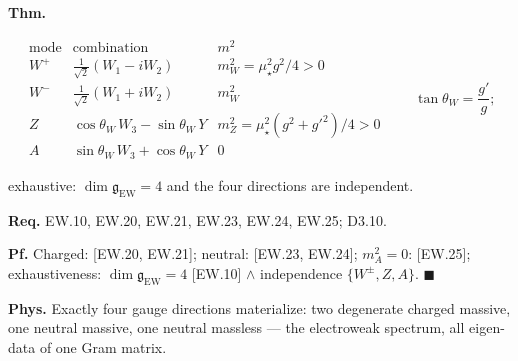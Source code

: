 \begin{theorem}\label{tag:EW-28}
\textbf{Thm.}

\[
\begin{array}{c|c|c}
\text{mode} & \text{combination} & m^2\\ \hline
W^+ & \tfrac1{\sqrt2}(W_1-iW_2) & m_W^2=\mu_\star^2g^2/4>0\\
W^- & \tfrac1{\sqrt2}(W_1+iW_2) & m_W^2\\
Z & \cos\theta_W\,W_3-\sin\theta_W\,Y & m_Z^2=\mu_\star^2(g^2+g'^2)/4>0\\
A & \sin\theta_W\,W_3+\cos\theta_W\,Y & 0
\end{array}
\qquad\tan\theta_W=\frac{g'}{g};
\]

exhaustive: $\dim\mathfrak g_{\mathrm{EW}}=4$ and the four directions are independent.

\textbf{Req.} EW.10, EW.20, EW.21, EW.23, EW.24, EW.25; D3.10.

\textbf{Pf.} Charged: [EW.20, EW.21]; neutral: [EW.23, EW.24]; $m_A^2=0$: [EW.25]; exhaustiveness: $\dim\mathfrak g_{\mathrm{EW}}=4$ [EW.10] $\wedge$ independence $\{W^\pm,Z,A\}$. $\blacksquare$

\textbf{Phys.} Exactly four gauge directions materialize: two degenerate charged massive, one neutral massive, one neutral massless — the electroweak spectrum, all eigen-data of one Gram matrix.

\end{theorem}

